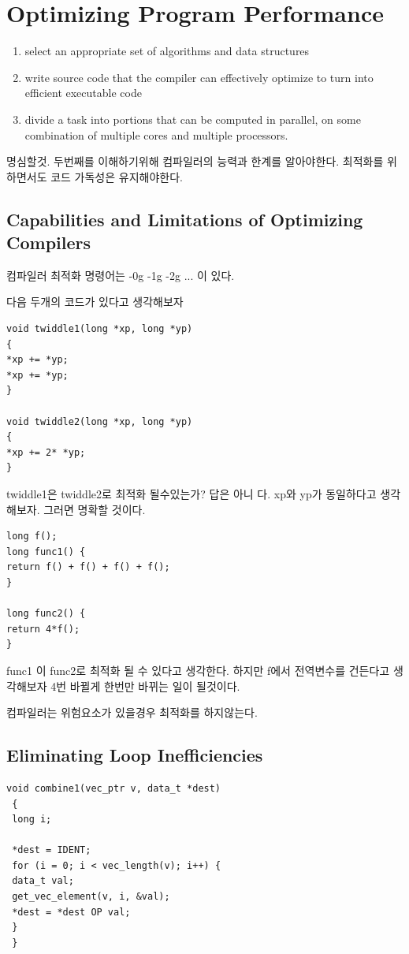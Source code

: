 
\chapter{Optimizing Program Performance}

\begin{enumerate}
    \item select an appropriate set of algorithms and data structures
    \item  write source code that the compiler can effectively optimize to turn into efficient executable code
    \item  divide a task into portions that can be computed in parallel, on some combination of multiple cores and multiple processors.
\end{enumerate}
명심할것. 두번째를 이해하기위해 컴파일러의 능력과 한계를 알아야한다. 최적화를 위하면서도 코드 가독성은 유지해야한다.


\section{Capabilities and Limitations of Optimizing Compilers}


컴파일러 최적화 명령어는 -0g -1g -2g ... 이 있다.


다음 두개의 코드가 있다고 생각해보자 
\begin{lstlisting}[style = CStyle]
void twiddle1(long *xp, long *yp)
{
*xp += *yp;
*xp += *yp;
}

void twiddle2(long *xp, long *yp)
{
*xp += 2* *yp;
}
\end{lstlisting}
twiddle1은 twiddle2로 최적화 될수있는가? 답은 아니 다. xp와 yp가 동일하다고 생각해보자. 그러면 명확할 것이다.


\begin{lstlisting}[style = CStyle]
long f();
long func1() {
return f() + f() + f() + f();
}

long func2() {
return 4*f();
}
\end{lstlisting}
func1 이 func2로 최적화 될 수 있다고 생각한다. 하지만 f에서 전역변수를 건든다고 생각해보자 4번 바뀔게 한번만 바뀌는 일이 될것이다.

컴파일러는 위험요소가 있을경우 최적화를 하지않는다.

\section{Eliminating Loop Inefficiencies}

\begin{lstlisting}[style = CStyle]
void combine1(vec_ptr v, data_t *dest)
 {
 long i;

 *dest = IDENT;
 for (i = 0; i < vec_length(v); i++) {
 data_t val;
 get_vec_element(v, i, &val);
 *dest = *dest OP val;
 }
 }

\end{lstlisting}

